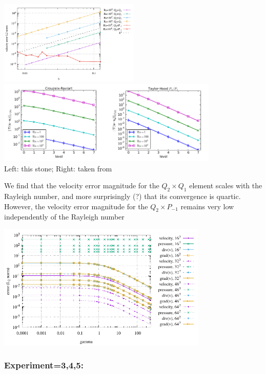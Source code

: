 \begin{center}
\includegraphics[height=4cm]{python_codes/fieldstone_104/results/exp2/errors.pdf}
\includegraphics[height=4cm]{python_codes/fieldstone_104/results/exp2/jolm17a}\\
{\captionfont Left: this stone; Right: taken from \cite{jolm17}}
\end{center}

We find that the velocity error magnitude for the $Q_2\times Q_1$ element
scales with the Rayleigh number, and 
more surprisingly (?) that its convergence is quartic.
However, the velocity error magnitude for the $Q_2\times P_{-1}$ 
remains very low independently of the Rayleigh number

\begin{center}
\includegraphics[height=6cm]{python_codes/fieldstone_104/results/exp2/gamma/errors.pdf}
\end{center}

\subsubsection*{Experiment=3,4,5: }

